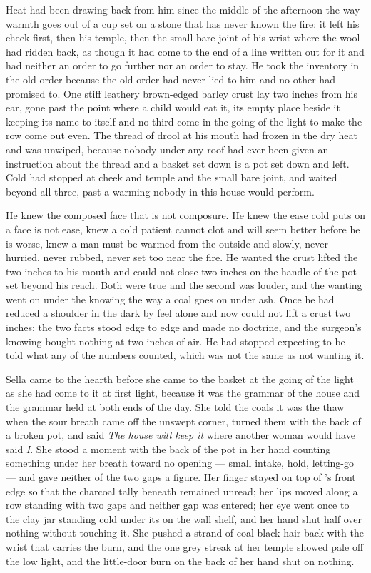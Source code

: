 Heat had been drawing back from him since the middle of the afternoon the way warmth goes out of a cup set on a stone that has never known the fire: it left his cheek first, then his temple, then the small bare joint of his wrist where the wool had ridden back, as though it had come to the end of a line written out for it and had neither an order to go further nor an order to stay. He took the inventory in the old order because the old order had never lied to him and no other had promised to. One stiff leathery brown-edged barley crust lay two inches from his ear, gone past the point where a child would eat it, its empty place beside it keeping its name to itself and no third come in the going of the light to make the row come out even. The thread of drool at his mouth had frozen in the dry heat and was unwiped, because nobody under any roof had ever been given an instruction about the thread and a basket set down is a pot set down and left. Cold had stopped at cheek and temple and the small bare joint, and  waited beyond all three, past a warming nobody in this house would perform.

He knew the composed face that is not composure. He knew the ease cold puts on a face is not ease, knew a cold patient cannot clot and will seem better before he is worse, knew a man must be warmed from the outside and slowly, never hurried, never rubbed, never set too near the fire. He wanted the crust lifted the two inches to his mouth and could not close two inches on the handle of the pot set beyond his reach. Both were true and the second was louder, and the wanting went on under the knowing the way a coal goes on under ash. Once he had reduced a shoulder in the dark by feel alone and now could not lift a crust two inches; the two facts stood edge to edge and made no doctrine, and the surgeon's knowing bought nothing at two inches of air. He had stopped expecting to be told what any of the numbers counted, which was not the same as not wanting it.

\scenebreak

Sella came to the hearth before she came to the basket at the going of the light as she had come to it at first light, because it was the grammar of the house and the grammar held at both ends of the day. She told the coals it was the thaw when the sour breath came off the unswept corner, turned them with the back of a broken pot, and said \emph{The house will keep it} where another woman would have said \emph{I}. She stood a moment with the back of the pot in her hand counting something under her breath toward no opening --- small intake, hold, letting-go --- and gave neither of the two gaps a figure. Her finger stayed on top of 's front edge so that the charcoal tally beneath remained unread; her lips moved along a row standing with two gaps and neither gap was entered; her eye went once to the clay jar standing cold under its  on the wall shelf, and her hand shut half over nothing without touching it. She pushed a strand of coal-black hair back with the wrist that carries the burn, and the one grey streak at her temple showed pale off the low light, and the little-door burn on the back of her hand shut on nothing.

